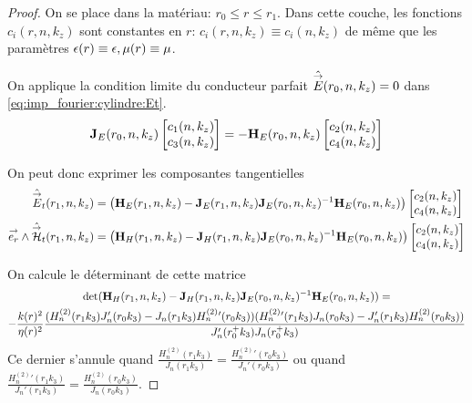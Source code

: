     \begin{proof}
      On se place dans la matériau: \(r_0 \le r \le r_ 1 \). Dans cette couche, les fonctions \(c_i(r,n,k_z)\) sont constantes en \(r\): \(c_i(r,n,k_z) \equiv c_i(n,k_z)\) de même que les paramètres \(\epsilon(r)\equiv \epsilon, \mu(r)\equiv \mu\).

      On applique la condition limite du conducteur parfait \(\hat {{\overset{\rightarrow}{E}}}(r_0,n,k_z) = 0\) dans \eqref{eq:imp_fourier:cylindre:Et}.
      \begin{equation*}
        \mathbf{J}_{E}(r_0,n,k_z)
        \begin{bmatrix}
          c_1(n,k_z) \\
          c_3(n,k_z)
        \end{bmatrix}
        =-\mathbf{H}_{E}(r_0,n,k_z)
        \begin{bmatrix}
          c_2(n,k_z) \\
          c_4(n,k_z)
        \end{bmatrix}
      \end{equation*}

      On peut donc exprimer les composantes tangentielles%
      \begin{align*}
        \hat {{\overset{\rightarrow}{E}}}_t(r_1,n,k_z) &=
        \left(\mathbf{H}_{E}(r_1,n,k_z) - \mathbf{J}_{E}(r_1,n,k_z)\mathbf{J}_{E}(r_0,n,k_z)^{-1}\mathbf{H}_{E}(r_0,n,k_z)\right)
        \begin{bmatrix}
          c_2(n,k_z) \\
          c_4(n,k_z)
        \end{bmatrix}
        \\
        {\overset{\rightarrow}{e_r}}\wedge \hat {{\overset{\rightarrow}{\mathcal{H}}}}_t(r_1,n,k_z) &=
        \left(\mathbf{H}_{H}(r_1,n,k_z) - \mathbf{J}_{H}(r_1,n,k_z)\mathbf{J}_{E}(r_0,n,k_z)^{-1}\mathbf{H}_{E}(r_0,n,k_z) \right)
        \begin{bmatrix}
          c_2(n,k_z) \\
          c_4(n,k_z)
        \end{bmatrix}
      \end{align*}

      On calcule le déterminant de cette matrice 
      \begin{multline*}
        \det(\mathbf{H}_{H}(r_1,n,k_z) - \mathbf{J}_{H}(r_1,n,k_z)\mathbf{J}_{E}(r_0,n,k_z)^{-1}\mathbf{H}_{E}(r_0,n,k_z)) = \\
        -\dfrac{k(r)^2}{\eta(r)^2}\dfrac{(H_n^{(2)}(r_1k_3)J_n'(r_0k_3)-J_n(r_1k_3)H_n^{(2)}{}'(r_0k_3))(H_n^{(2)}{}'(r_1k_3)J_n(r_0k_3)-J_n'(r_1k_3)H_n^{(2)}(r_0k_3))}{J_n'(r_0^+k_3)J_n(r_0^+k_3)}
      \end{multline*}
      Ce dernier s'annule quand \(\frac{H_n^{(2)}(r_1k_3)}{J_n(r_1k_3)} = \frac{H_n^{(2)}{}'(r_0k_3)}{J_n'(r_0k_3)}\) ou quand \(\frac{H_n^{(2)}{}'(r_1k_3)}{J_n'(r_1k_3)} = \frac{H_n^{(2)}(r_0k_3)}{J_n(r_0k_3)}\).


\end{proof}
